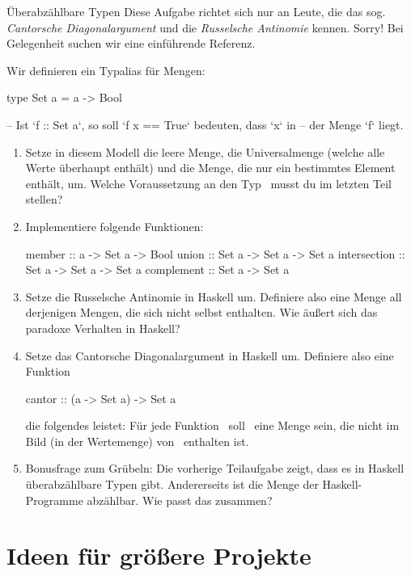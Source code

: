 \documentclass{uebblatt}
\begin{document}
\begin{aufgabe}{Überabzählbare Typen}
Diese Aufgabe richtet sich nur an Leute, die das sog. \emph{Cantorsche
Diagonalargument} und die \emph{Russelsche Antinomie} kennen. Sorry! Bei
Gelegenheit suchen wir eine einführende Referenz.

Wir definieren ein Typalias für Mengen:
\begin{haskellcode}
type Set a = a -> Bool

-- Ist `f :: Set a`, so soll `f x == True` bedeuten, dass `x` in
-- der Menge `f` liegt.
\end{haskellcode}
\begin{enumerate}
\item Setze in diesem Modell die leere Menge, die Universalmenge (welche alle
Werte überhaupt enthält) und die Menge, die nur ein bestimmtes Element enthält,
um. Welche Voraussetzung an den Typ~ musst du im letzten Teil
stellen?
\item Implementiere folgende Funktionen:
\begin{haskellcode}
member       :: a     -> Set a -> Bool
union        :: Set a -> Set a -> Set a
intersection :: Set a -> Set a -> Set a
complement   :: Set a -> Set a
\end{haskellcode}
\item Setze die Russelsche Antinomie in Haskell um. Definiere also eine Menge
all derjenigen Mengen, die sich nicht selbst enthalten. Wie äußert sich das
paradoxe Verhalten in Haskell?
\item Setze das Cantorsche Diagonalargument in Haskell um. Definiere also eine
Funktion
\begin{haskellcode}
cantor :: (a -> Set a) -> Set a
\end{haskellcode}
die folgendes leistet: Für jede Funktion~
soll~ eine Menge sein, die nicht im Bild (in der
Wertemenge) von~ enthalten ist.
\item Bonusfrage zum Grübeln: Die vorherige Teilaufgabe zeigt, dass es in
Haskell überabzählbare Typen gibt. Andererseits ist die Menge der
Haskell-Programme abzählbar. Wie passt das zusammen?
\end{enumerate}
\end{aufgabe}


\section{Ideen für größere Projekte}
\end{document}
